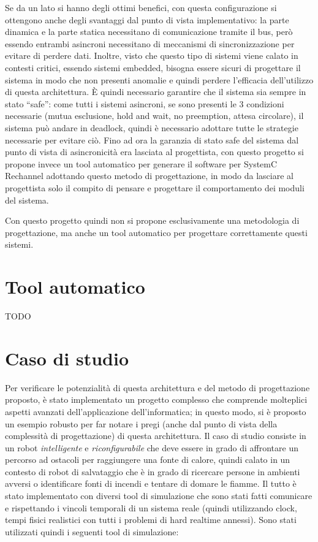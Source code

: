 \documentclass[11pt]{article} %
\begin{document}
Se da un lato si hanno degli ottimi benefici, con questa configurazione si ottengono anche degli svantaggi dal punto di vista implementativo: la parte dinamica e la parte statica necessitano di comunicazione tramite il bus, però essendo entrambi asincroni necessitano di meccanismi di sincronizzazione per evitare di perdere dati. Inoltre, visto che questo tipo di sistemi viene calato in contesti critici, essendo sistemi embedded, bisogna essere sicuri di progettare il sistema in modo che non presenti anomalie e quindi perdere l'efficacia dell'utilizzo di questa architettura.
È quindi necessario garantire che il sistema sia sempre in stato ``safe'': come tutti i sistemi asincroni, se sono presenti le 3 condizioni necessarie (mutua esclusione, hold and wait, no preemption, attesa circolare), il sistema può andare in deadlock, quindi è necessario adottare tutte le strategie necessarie per evitare ciò.
Fino ad ora la garanzia di stato safe del sistema dal punto di vista di asincronicità era lasciata al progettista, con questo progetto si propone invece un tool automatico per generare il software per SystemC Rechannel adottando questo metodo di progettazione, in modo da lasciare al progettista solo il compito di pensare e progettare il comportamento dei moduli del sistema.

Con questo progetto quindi non si propone esclusivamente una metodologia di progettazione, ma anche un tool automatico per progettare correttamente questi sistemi.

\section{Tool automatico}

TODO

\section{Caso di studio}

Per verificare le potenzialità di questa architettura e del metodo di progettazione proposto, è stato implementato un progetto complesso che comprende molteplici aspetti avanzati dell'applicazione dell'informatica; in questo modo, si è proposto un esempio robusto per far notare i pregi (anche dal punto di vista della complessità di progettazione) di questa architettura.
Il caso di studio consiste in un robot \textit{intelligente} e \textit{riconfigurabile} che deve essere in grado di affrontare un percorso ad ostacoli per raggiungere una fonte di calore, quindi calato in un contesto di robot di salvataggio che è in grado di ricercare persone in ambienti avversi o identificare fonti di incendi e tentare di domare le fiamme. Il tutto è stato implementato con diversi tool di simulazione che sono stati fatti comunicare e rispettando i vincoli temporali di un sistema reale (quindi utilizzando clock, tempi fisici realistici con tutti i problemi di hard realtime annessi).
Sono stati utilizzati quindi i seguenti tool di simulazione:
\end{document}
